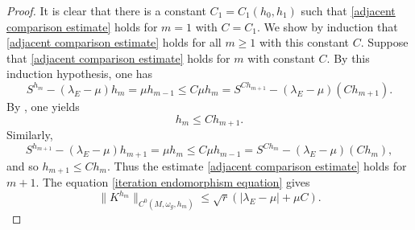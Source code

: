 \documentclass[12pt, reqno]{amsart}
\theoremstyle{plain}
\theoremstyle{definition}
\newcommand{\beq}{\begin{equation}}
\newcommand{\eeq}{\end{equation}}
\renewcommand{\>}{\rightarrow}
\newcommand{\om}{\omega}
\numberwithin{equation}{section}
\begin{document}
\begin{proof}  It is clear that there is a constant $C_1=C_1(h_0,h_1)$ such that 
	\eqref{adjacent comparison estimate} holds for $m=1$ with $C=C_1$. We show by induction that  	\eqref{adjacent comparison estimate} holds for all $m\geq 1$  with this constant $C$.  Suppose that \eqref{adjacent comparison estimate} holds for $m$ with constant $C$.   By this induction hypothesis, one has
	\beq 
	S^{h_m}-(\lambda_E-\mu) h_m=\mu h_{m-1}
	\leq C\mu h_m
	=S^{Ch_{m+1}}- (\lambda_E-\mu) \left(Ch_{m+1}\right).
	\eeq 
	By \cite[Theorem~2.3]{WYY26b+}, one yields
	\beq h_m\leq C h_{m+1}.\eeq   Similarly,
	\beq 
	S^{h_{m+1}}-(\lambda_E-\mu)  h_{m+1}=\mu h_m
	\leq C\mu h_{m-1}
	=S^{Ch_m}-(\lambda_E-\mu)  (Ch_m),
	\eeq 
	and so
	$h_{m+1}\leq C h_m$.  Thus the estimate \eqref{adjacent comparison estimate} holds	for  $m+1$. The equation
	\eqref{iteration endomorphism equation} gives
	\beq 
	\|K^{h_m}\|_{C^0(M,\om_g,h_m)}
	\leq \sqrt r\left(|\lambda_E-\mu|+\mu C\right).
	\eeq 
	

\end{proof}
\end{document}
